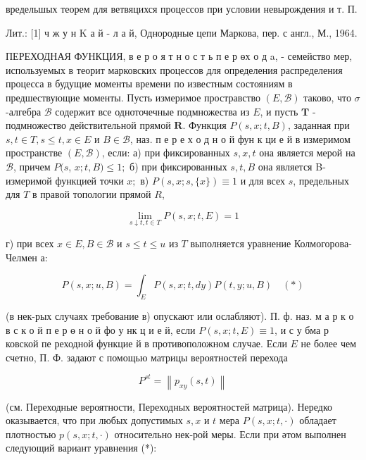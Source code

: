 \documentclass[10pt]{article}
\begin{document}
вредельшых теорем для ветвяцихся процессов при условии невырождения и т. П.



Лит.: [1] ч ж у н K а й - л а й, Однородные цепи Маркова, пер. с англ., М., 1964.



ПЕРЕХОДНАЯ ФУНКЦИЯ, в е р о я т н о с т ь п е р өх о д a, - семейство мер, используемых в теорит марковских процессов для определения распределения процесса в будущие моменты времени по известным состояниям в предшествующие моменты. Пусть измеримое простравство $(E, \mathscr{B})$ таково, что $\sigma$-алгебра $\mathscr{B}$ содержит все одноточечные подмножества из $E$, и пусть $\boldsymbol{T}$ - подмножество действительной прямой $\boldsymbol{R}$. Функция $P(s, x ; t, B)$, заданная при $s, t \in T, s \leqslant t, x \in E$ и $B \in \mathscr{B}$, наз. п е р е х о д н о й фун к ци е й в измеримом пространстве $(E, \mathscr{B})$, если: а) при фиксированных $s, x, t$ она является мерой на $\mathscr{B}$, причем $P(s$, $x ; t, B) \leqslant 1 ;$ б) при фиксированных $s, t, B$ она является B-измеримой функцией точки $x ;$ в) $P(s, x ; s,\{x\}) \equiv 1$ и для всех $s$, предельных для $T$ в правой топологии прямой $R$,



\[

\lim _{s \downarrow t, t \in T} P(s, x ; t, E)=1

\]



г) при всех $x \in E, B \in \mathscr{B}$ и $s \leqslant t \leqslant u$ из $T$ выполняется уравнение Колмогорова- Челмен а:



\[

P(s, x ; u, B)=\int_{E} P(s, x ; t, d y) P(t, y ; u, B) \quad(*)

\]



(в нек-рых случаях требование в) опускают или ослабляют). П. ф. наз. м а р к о в с к о й п е р ө н о й фо у нк ц и е й, если $P(s, x ; t, E) \equiv 1$, и с у бма р ковской пе реходной функцие й в противоположном случае. Если $E$ не более чем счетно, П. Ф. задают с помощью матрицы вероятностей перехода



\[

P^{s t}=\left\|p_{x y}(s, t)\right\|

\]



(см. Переходные вероятности, Переходных вероятностей матрица). Нередко оказывается, что при любых допустимых $s, x$ и $t$ мера $P(s, x ; t, \cdot)$ обладает плотностью $p(s, x ; t, \cdot)$ относительно нек-рой меры. Если при әтом выполнен следующий вариант уравнения (*):
\end{document}
